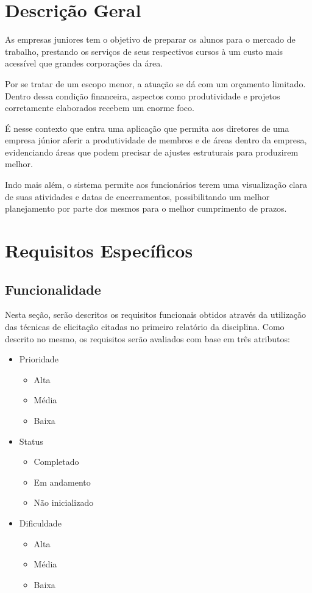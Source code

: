 \section{Descrição Geral}

  As empresas juniores tem o objetivo de preparar os alunos para o mercado de trabalho, prestando os serviços de seus respectivos cursos à um custo mais acessível que grandes corporações da área.

  Por se tratar de um escopo menor, a atuação se dá com um orçamento limitado. Dentro dessa condição financeira, aspectos como produtividade e projetos corretamente elaborados recebem um enorme foco.

  É nesse contexto que entra uma aplicação que permita aos diretores de uma empresa júnior aferir a produtividade de membros e de áreas dentro da empresa, evidenciando áreas que podem precisar de ajustes estruturais para produzirem melhor.

  Indo mais além, o sistema permite aos funcionários terem uma visualização clara de suas atividades e datas de encerramentos, possibilitando um melhor planejamento por parte dos mesmos para o melhor cumprimento de prazos.

\section{Requisitos Específicos}

\subsection{Funcionalidade}

  Nesta seção, serão descritos os requisitos funcionais obtidos através da utilização das técnicas de elicitação citadas no primeiro relatório da disciplina. Como descrito no mesmo, os requisitos serão avaliados com base em três atributos:

\begin{itemize}
\item{
  Prioridade

  \begin{itemize}
    \item{Alta}
    \item{Média}
    \item{Baixa}
  \end{itemize}
}
\item{
  Status

  \begin{itemize}
    \item{Completado}
    \item{Em andamento}
    \item{Não inicializado}
  \end{itemize}
}
\item{
  Dificuldade

  \begin{itemize}
    \item{Alta}
    \item{Média}
    \item{Baixa}
  \end{itemize}
}
\end{itemize}

